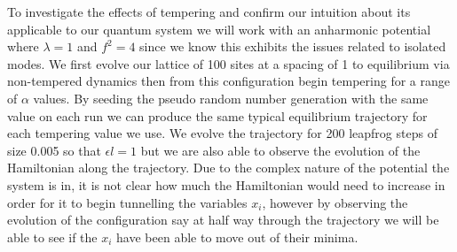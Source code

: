 \documentclass[12pt]{article}
\begin{document}
    To investigate the effects of tempering and confirm our intuition about its applicable to our quantum system we will work with an anharmonic potential where $\lambda=1$ and $f^2=4$ since we know this exhibits the issues related to isolated modes. We first evolve our lattice of 100 sites at a spacing of 1 to equilibrium via non-tempered dynamics then from this configuration begin tempering for a range of $\alpha$ values. By seeding the pseudo random number generation with the same value on each run we can produce the same typical equilibrium trajectory for each tempering value we use. We evolve the trajectory for 200 leapfrog steps of size 0.005 so that $\epsilon l = 1$ but we are also able to observe the evolution of the Hamiltonian along the trajectory. Due to the complex nature of the potential the system is in, it is not clear how much the Hamiltonian would need to increase in order for it to begin tunnelling the variables $x_i$, however by observing the evolution of the configuration say at half way through the trajectory we will be able to see if the $x_i$ have been able to move out of their minima.
\end{document}
